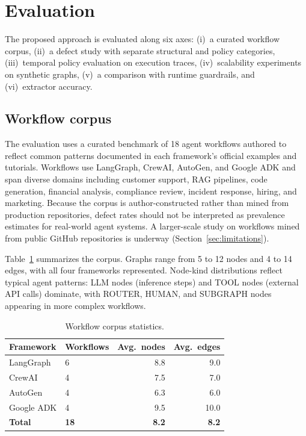 \section{Evaluation}
\label{sec:evaluation}

The proposed approach is evaluated along six axes: (i)~a curated workflow
corpus, (ii)~a defect study with separate structural and policy
categories, (iii)~temporal policy evaluation on execution traces,
(iv)~scalability experiments on synthetic graphs, (v)~a comparison
with runtime guardrails, and (vi)~extractor accuracy.

\subsection{Workflow corpus}

The evaluation uses a curated benchmark of 18 agent workflows
authored to reflect common patterns documented in each framework's
official examples and tutorials. Workflows use LangGraph, CrewAI,
AutoGen, and Google ADK and span diverse domains including customer
support, RAG pipelines, code generation, financial analysis, compliance
review, incident response, hiring, and marketing. Because the corpus is
author-constructed rather than mined from production repositories,
defect rates should not be interpreted as prevalence estimates for
real-world agent systems. A larger-scale study on workflows mined from
public GitHub repositories is underway
(Section~\ref{sec:limitations}).

Table~\ref{tab:corpus} summarizes the corpus. Graphs range from 5 to
12 nodes and 4 to 14 edges, with all four frameworks represented.
Node-kind distributions reflect typical agent patterns: LLM nodes
(inference steps) and TOOL nodes (external API calls) dominate, with
ROUTER, HUMAN, and SUBGRAPH nodes appearing in more complex workflows.

\begin{table}[t]
\centering
\small
\caption{Workflow corpus statistics.}
\label{tab:corpus}
\begin{tabular}{@{}llrr@{}}
\toprule
\textbf{Framework} & \textbf{Workflows} & \textbf{Avg.\ nodes} & \textbf{Avg.\ edges} \\
\midrule
LangGraph & 6 & 8.8 & 9.0 \\
CrewAI & 4 & 7.5 & 7.0 \\
AutoGen & 4 & 6.3 & 6.0 \\
Google ADK & 4 & 9.5 & 10.0 \\
\midrule
\textbf{Total} & \textbf{18} & \textbf{8.2} & \textbf{8.2} \\
\bottomrule
\end{tabular}
\end{table}

